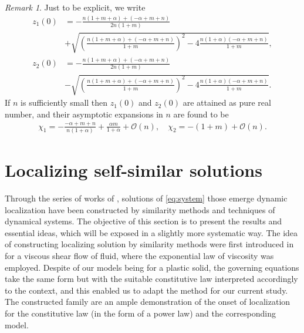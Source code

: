 \documentclass[a4paper,11pt]{article}
\theoremstyle{remark}
\newtheorem{remark}{Remark}[section]
\begin{document}
\begin{remark}
Just to be explicit, we write
\begin{align*}
 z_1(0) &= -\frac{n(1+m+\alpha) + (-\alpha+m+n)}{2n(1+m)} \\
 &+ \sqrt{\left(\frac{n(1+m+\alpha) + (-\alpha+m+n)}{1+m}\right)^2 -4 \frac{n(1+\alpha)(-\alpha+m+n)}{1+m}},\\
 z_2(0) &= -\frac{n(1+m+\alpha) + (-\alpha+m+n)}{2n(1+m)} \\
 &- \sqrt{\left(\frac{n(1+m+\alpha) + (-\alpha+m+n)}{1+m}\right)^2 -4 \frac{n(1+\alpha)(-\alpha+m+n)}{1+m}}.
\end{align*}
 If $n$ is sufficiently small then $z_1(0)$ and $z_2(0)$ are attained as pure real number, and their asymptotic expansions in $n$ are found to be
\begin{align*}
 \chi_1 = -\frac{-\alpha+m+n}{n(1+\alpha)} + \frac{\alpha m}{1+\alpha} + \mathcal{O}(n), \quad
 \chi_2 = -(1+m)  + \mathcal{O}(n).
\end{align*}
\end{remark}

\section{Localizing self-similar solutions}
Through the series of works of \cite{KOT14,KLT_16, KLT_HYP2016, KLT17}, solutions of \eqref{eq:system} those emerge dynamic localization have been constructed by similarity methods and techniques of dynamical systems. The objective of this section is to present the results and essential ideas, which will be exposed in a slightly more systematic way. The idea of constructing localizing solution by similarity methods were first introduced in \cite{KOT14} for a viscous shear flow of fluid, where the exponential law of viscosity was employed. Despite of our models being for a plastic solid, the governing equations take the same form but with the suitable constitutive law interpreted accordingly to the context, and this enabled us to adapt the method for our current study. The constructed family are an ample demonstration of the onset of localization for the constitutive law (in the form of a power law) and the corresponding model.
\end{document}
